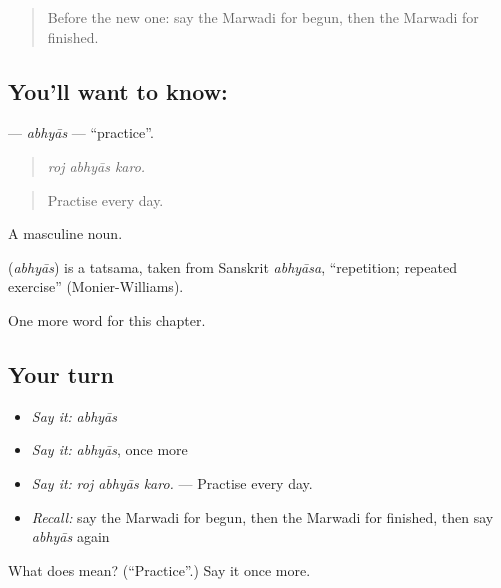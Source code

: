 \label{lesson:MW-C290-abhyas}



\begin{quote}
Before the new one: say the Marwadi for begun, then the Marwadi for finished.
\end{quote}

\subsection*{You'll want to know: }
\textbf{} — \emph{abhyās} — \textquotedblleft{}practice\textquotedblright{}.

\begin{quote}
  
\end{quote}

\begin{quote}
\emph{roj abhyās karo.}
\end{quote}

\begin{quote}
Practise every day.
\end{quote}

A masculine noun.

\begin{cousinweb}
\textbf{} (\emph{abhyās}) is a tatsama, taken from Sanskrit \emph{abhyāsa}, \textquotedblleft{}repetition; repeated exercise\textquotedblright{} (Monier-Williams).
\end{cousinweb}

\begin{grammarlens}[title={What you've built}]
One more word for this chapter.
\end{grammarlens}

\subsection*{Your turn}
\begin{itemize}
\raggedright
  \item \emph{Say it:} \emph{abhyās}
  \item \emph{Say it:} \emph{abhyās}, once more
  \item \emph{Say it:} \emph{roj abhyās karo.} — Practise every day.
  \item \emph{Recall:} say the Marwadi for begun, then the Marwadi for finished, then say \emph{abhyās} again
\end{itemize}

\begin{tcolorbox}[breakable,colback=teal!4,colframe=teal!35!black,title={Before you move on}]
What does  mean? (\textquotedblleft{}Practice\textquotedblright{}.) Say it once more.
\end{tcolorbox}

